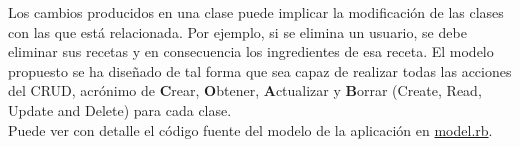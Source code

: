 Los cambios producidos en una clase puede implicar la modificación de las clases con las que está relacionada. Por ejemplo, si se elimina un usuario, se debe eliminar sus recetas y en consecuencia los ingredientes de esa receta. El modelo propuesto se ha diseñado de tal forma que sea capaz de realizar todas las acciones del CRUD, acrónimo de \textbf{C}rear, \textbf{O}btener, \textbf{A}ctualizar y \textbf{B}orrar (Create, Read, Update and Delete) para cada clase. \\

Puede ver con detalle el código fuente del modelo de la aplicación en \href{https://github.com/alu0100207385/ChefManagement/blob/master/app/models/model.rb}{model.rb}.

